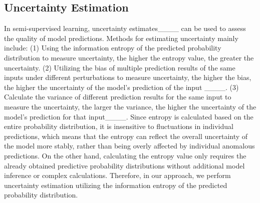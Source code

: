 \subsection{Uncertainty Estimation}
In semi-supervised learning, uncertainty estimates____ can be used to assess the quality of model predictions. Methods for estimating uncertainty mainly include: (1) Using the information entropy of the predicted probability distribution to measure uncertainty, the higher the entropy value, the greater the uncertainty. (2) Utilizing the bias of multiple prediction results of the same inputs under different perturbations to measure uncertainty, the higher the bias, the higher the uncertainty of the model's prediction of the input ____. (3) Calculate the variance of different prediction results for the same input to measure the uncertainty, the larger the variance, the higher the uncertainty of the model's prediction for that input____. Since entropy is calculated based on the entire probability distribution, it is insensitive to fluctuations in individual predictions, which means that the entropy can reflect the overall uncertainty of the model more stably, rather than being overly affected by individual anomalous predictions. On the other hand, calculating the entropy value only requires the already obtained predictive probability distributions without additional model inference or complex calculations. Therefore, in our approach, we perform uncertainty estimation utilizing the information entropy of the predicted probability distribution.